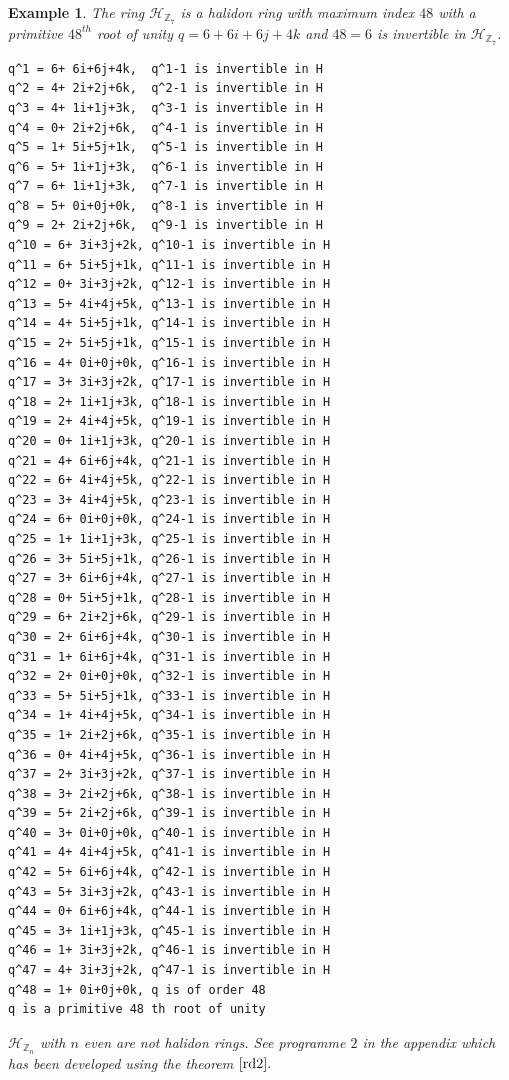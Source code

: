 \documentclass[sn-mathphys,Numbered]{sn-jnl}%
\theoremstyle{thmstyleone}
\theoremstyle{thmstyletwo}
\newtheorem{example}{Example}
\theoremstyle{thmstylethree}
\begin{document}
\begin{example}
The ring $\mathcal{H}_{\mathbb{Z}_{7}}$ is a halidon ring with maximum index $48$ with a primitive $48^{th}$ root of unity $q = 6+ 6i+6j+4k$ and $48=6$ is invertible in $\mathcal{H}_{\mathbb{Z}_{7}}$.
\begin{verbatim}
q^1 = 6+ 6i+6j+4k,  q^1-1 is invertible in H
q^2 = 4+ 2i+2j+6k,  q^2-1 is invertible in H
q^3 = 4+ 1i+1j+3k,  q^3-1 is invertible in H
q^4 = 0+ 2i+2j+6k,  q^4-1 is invertible in H
q^5 = 1+ 5i+5j+1k,  q^5-1 is invertible in H
q^6 = 5+ 1i+1j+3k,  q^6-1 is invertible in H
q^7 = 6+ 1i+1j+3k,  q^7-1 is invertible in H
q^8 = 5+ 0i+0j+0k,  q^8-1 is invertible in H
q^9 = 2+ 2i+2j+6k,  q^9-1 is invertible in H
q^10 = 6+ 3i+3j+2k, q^10-1 is invertible in H
q^11 = 6+ 5i+5j+1k, q^11-1 is invertible in H
q^12 = 0+ 3i+3j+2k, q^12-1 is invertible in H
q^13 = 5+ 4i+4j+5k, q^13-1 is invertible in H
q^14 = 4+ 5i+5j+1k, q^14-1 is invertible in H
q^15 = 2+ 5i+5j+1k, q^15-1 is invertible in H
q^16 = 4+ 0i+0j+0k, q^16-1 is invertible in H
q^17 = 3+ 3i+3j+2k, q^17-1 is invertible in H
q^18 = 2+ 1i+1j+3k, q^18-1 is invertible in H
q^19 = 2+ 4i+4j+5k, q^19-1 is invertible in H
q^20 = 0+ 1i+1j+3k, q^20-1 is invertible in H
q^21 = 4+ 6i+6j+4k, q^21-1 is invertible in H
q^22 = 6+ 4i+4j+5k, q^22-1 is invertible in H
q^23 = 3+ 4i+4j+5k, q^23-1 is invertible in H
q^24 = 6+ 0i+0j+0k, q^24-1 is invertible in H
q^25 = 1+ 1i+1j+3k, q^25-1 is invertible in H
q^26 = 3+ 5i+5j+1k, q^26-1 is invertible in H
q^27 = 3+ 6i+6j+4k, q^27-1 is invertible in H
q^28 = 0+ 5i+5j+1k, q^28-1 is invertible in H
q^29 = 6+ 2i+2j+6k, q^29-1 is invertible in H
q^30 = 2+ 6i+6j+4k, q^30-1 is invertible in H
q^31 = 1+ 6i+6j+4k, q^31-1 is invertible in H
q^32 = 2+ 0i+0j+0k, q^32-1 is invertible in H
q^33 = 5+ 5i+5j+1k, q^33-1 is invertible in H
q^34 = 1+ 4i+4j+5k, q^34-1 is invertible in H
q^35 = 1+ 2i+2j+6k, q^35-1 is invertible in H
q^36 = 0+ 4i+4j+5k, q^36-1 is invertible in H
q^37 = 2+ 3i+3j+2k, q^37-1 is invertible in H
q^38 = 3+ 2i+2j+6k, q^38-1 is invertible in H
q^39 = 5+ 2i+2j+6k, q^39-1 is invertible in H
q^40 = 3+ 0i+0j+0k, q^40-1 is invertible in H
q^41 = 4+ 4i+4j+5k, q^41-1 is invertible in H
q^42 = 5+ 6i+6j+4k, q^42-1 is invertible in H
q^43 = 5+ 3i+3j+2k, q^43-1 is invertible in H
q^44 = 0+ 6i+6j+4k, q^44-1 is invertible in H
q^45 = 3+ 1i+1j+3k, q^45-1 is invertible in H
q^46 = 1+ 3i+3j+2k, q^46-1 is invertible in H
q^47 = 4+ 3i+3j+2k, q^47-1 is invertible in H
q^48 = 1+ 0i+0j+0k, q is of order 48
q is a primitive 48 th root of unity
\end{verbatim}
$\mathcal{H}_{\mathbb{Z}_{n}}$ with $n$ even are not halidon rings. See programme $2$ in the appendix which has been developed using the theorem $\ref{rd2}.$
\end{example}
\end{document}
